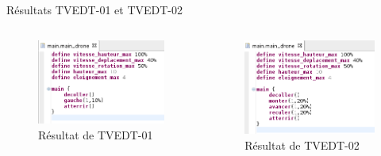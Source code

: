 \documentclass{bredelebeamer}
\begin{document}
\begin{frame}{Résultats TVEDT-01 et TVEDT-02} 
\begin{columns}
\begin{column}{0.5\textwidth}
\begin{figure}
\centering
\includegraphics[scale=0.45]{images/TVEDT-01.png}
\caption{Résultat de TVEDT-01}
\end{figure}
\end{column}
\begin{column}{0.5\textwidth}
\begin{figure}
\centering
\includegraphics[scale=0.4]{images/TVEDT-02.png}
\caption{Résultat de TVEDT-02}
\end{figure}
\end{column}
\end{columns}
\end{frame}
\end{document}
